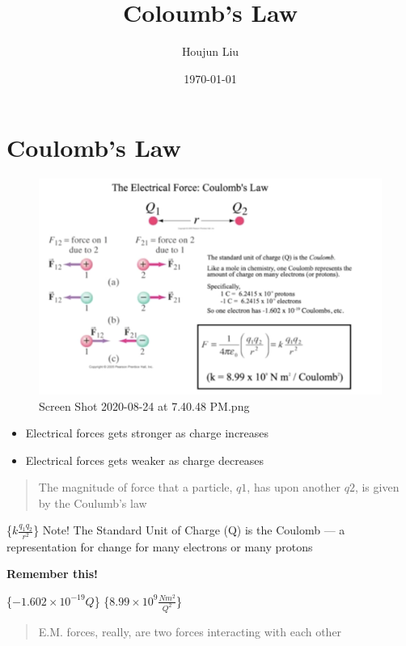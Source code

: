 \documentclass[letterpaper]{article}
\author{Houjun Liu}
\date{\today}
\title{Coloumb's Law}
\renewcommand{\tableofcontents}{}
\begin{document}
\tableofcontents



\section{Coulomb's Law}
\label{sec:org2da0d16}
\begin{figure}[htbp]
\centering
\includegraphics[width=.9\linewidth]{./Screen Shot 2020-08-24 at 7.40.48 PM.png}
\caption{Screen Shot 2020-08-24 at 7.40.48 PM.png}
\end{figure}

\begin{itemize}
\item Electrical forces gets stronger as charge increases
\item Electrical forces gets weaker as charge decreases
\end{itemize}

\begin{quote}
The magnitude of force that a particle, \(q1\), has upon another
\(q2\), is given by the Coulumb's law
\end{quote}

\{\(k\frac{q_1q_2}{r^2}\)\}
Note! The Standard Unit of Charge (Q) is the Coulomb --- a
representation for change for many electrons or many protons

\textbf{Remember this!}

\{\(-1.602 \times 10^{-19} Q\)\}
\{\(8.99 \times 10^9 \frac{Nm^2}{Q^2}\)\}

\begin{quote}
E.M. forces, really, are two forces interacting with each other
\end{quote}
\end{document}
